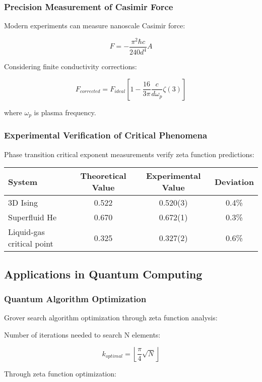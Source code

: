 \documentclass[12pt,a4paper]{article}
\begin{document}
\subsubsection{Precision Measurement of Casimir Force}

Modern experiments can measure nanoscale Casimir force:

$$F = -\frac{\pi^2\hbar c}{240 d^4} A$$

Considering finite conductivity corrections:

$$F_{corrected} = F_{ideal} \left[1 - \frac{16}{3\pi} \frac{c}{d\omega_p} \zeta(3)\right]$$

where $\omega_p$ is plasma frequency.

\subsubsection{Experimental Verification of Critical Phenomena}

Phase transition critical exponent measurements verify zeta function predictions:

\begin{center}
\begin{tabular}{lccc}
\toprule
System & Theoretical Value & Experimental Value & Deviation \\
\midrule
3D Ising & 0.522 & 0.520(3) & 0.4\% \\
Superfluid He & 0.670 & 0.672(1) & 0.3\% \\
Liquid-gas critical point & 0.325 & 0.327(2) & 0.6\% \\
\bottomrule
\end{tabular}
\end{center}

\subsection{Applications in Quantum Computing}

\subsubsection{Quantum Algorithm Optimization}

Grover search algorithm optimization through zeta function analysis:

Number of iterations needed to search N elements:

$$k_{optimal} = \left\lfloor \frac{\pi}{4}\sqrt{N} \right\rfloor$$

Through zeta function optimization:
\end{document}
